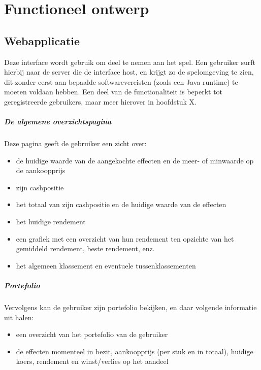 %
%

\chapter{Functioneel ontwerp}

\section{Webapplicatie}

Deze interface wordt gebruik om deel te nemen aan het spel. Een gebruiker surft hierbij naar de server die de interface host, en krijgt zo de spelomgeving te zien, dit zonder eerst aan bepaalde softwarevereisten (zoals een Java runtime) te moeten voldaan hebben. Een deel van de functionaliteit is beperkt tot geregistreerde gebruikers, maar meer hierover in hoofdstuk X.

\paragraph{De algemene overzichtspagina}
Deze pagina geeft de gebruiker een zicht over:
\begin{itemize}
	\item{de huidige waarde van de aangekochte effecten en de meer- of minwaarde op de aankoopprijs}
	\item{zijn cashpositie}
	\item{het totaal van zijn cashpositie en de huidige waarde van de effecten}
	\item{het huidige rendement}
	\item{een grafiek met een overzicht van hun rendement ten opzichte van het gemiddeld rendement, beste rendement, enz.}
	\item{het algemeen klassement en eventuele tussenklassementen}
\end{itemize}

\paragraph{Portefolio}
Vervolgens kan de gebruiker zijn portefolio bekijken, en daar volgende informatie uit halen:
\begin{itemize}
	\item{een overzicht van het portefolio van de gebruiker}
	\item{de effecten momenteel in bezit, aankoopprijs (per stuk en in totaal), huidige koers, rendement en winst/verlies op het aandeel}
\end{itemize}

